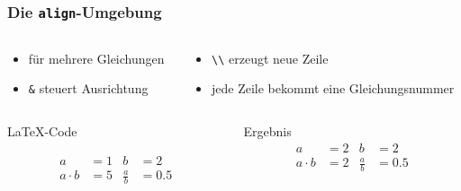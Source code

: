 \begin{frame}[fragile]
    \frametitle{Die \texttt{align}-Umgebung \hfill{}}
    \begin{columns}[t]
        \begin{column}{0.35\textwidth}
            \begin{itemize}
                \item für mehrere Gleichungen
                \item \texttt{\&} steuert Ausrichtung
            \end{itemize}
        \end{column}
        \begin{column}{0.6\textwidth}
            \begin{itemize}
                \item \texttt{\textbackslash\textbackslash} erzeugt neue Zeile
                \item jede Zeile bekommt eine Gleichungsnummer
            \end{itemize}
        \end{column}
    \end{columns}
    \vfill
    \begin{columns}[T]
        \begin{column}{0.65\textwidth}
            \begin{block}{\LaTeX-Code}
                \begin{lstverbatim}
                \begin{align}
                    a &= 1       & b&=2 \\
                    a\cdot b &=5 & \frac{a}{b} &= \num{0,5}
                \end{align}
                \end{lstverbatim}
            \end{block}
        \end{column}
        \begin{column}{0.3\textwidth}
            \begin{block}{Ergebnis}
                \begin{align}
                    a &= 2       & b&=2 \\
                    a\cdot b &=2 & \frac{a}{b} &= \num{0,5}
                \end{align}
            \end{block}
        \end{column}
    \end{columns}
\end{frame}
